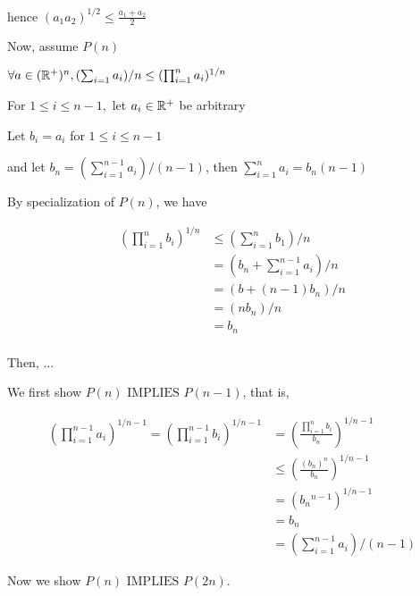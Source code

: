 \documentclass[12pt]{alittlebear}
\newcommand{\iimplies}{\,\,\mathrm{IMPLIES}\,\,}
\begin{document}
{{        hence $(a_1a_2)^{1/2}\leq\frac{a_1+a_2}{2}$

        Now, assume $P(n)$

        \begin{adjustwidth}{1cm}{}

            $\forall a\in (\mathbb{R}^+)^n, (\sum_{i=1} a_i)/n\leq (\prod_{i=1}^n a_i)^{1/n}$

            For $1\leq i\leq n-1,$ let $a_i\in\mathbb{R}^+$ be arbitrary 

            Let $b_i=a_i$ for $1\leq i\leq n-1$

            and let $b_n=(\sum_{i=1}^{n-1}a_i)/(n-1)$, then $\sum_{i=1}^n a_i = b_n(n-1)$

            By specialization of $P(n)$, we have 
            
            \begin{align*}
                (\prod_{i=1}^n b_i)^{1/n}&\leq(\sum_{i=1}^n b_1)/n\\
                &=(b_n+\sum_{i=1}^{n-1}a_i)/n\\
                &=(b+(n-1)b_n)/n\\
                &=(nb_n)/n\\
                &=b_n\\
            \end{align*}

            Then, ...
        \end{adjustwidth}

        \newpage
        
        \begin{adjustwidth}{1cm}{}
            
            We first show $P(n)\iimplies P(n-1)$, that is,

            $$
            \begin{aligned}
            \left(\prod_{i=1}^{n-1} a_i\right)^{1 / n-1}=\left(\prod_{i=1}^{n-1} b_i\right)^{1 / n-1} & =\left(\frac{\prod_{i=1}^n b_i}{b_n}\right)^{1 / n-1} \\
            & \leq\left(\frac{\left(b_n\right)^n}{b_n}\right)^{1 / n-1} \\
            & =\left(b_n{ }^{n-1}\right)^{1 / n-1} \\
            & =b_n \\
            & =\left(\sum_{i=1}^{n-1} a_i\right) /(n-1)
            \end{aligned}
            $$

            Now we show $P(n)\iimplies P(2n)$.


\end{adjustwidth}}}
\end{document}
